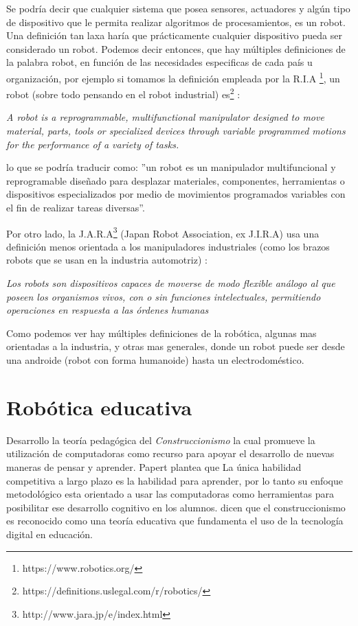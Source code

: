 Se podría decir que cualquier sistema que posea sensores, actuadores y algún tipo de dispositivo que le permita realizar algoritmos de procesamientos, es un robot. Una definición tan laxa haría que prácticamente cualquier dispositivo pueda ser considerado un robot. Podemos decir entonces, que hay múltiples definiciones de la palabra robot, en función de las necesidades especificas de cada país u organización, por ejemplo si tomamos la definición empleada por la R.I.A \footnote{https://www.robotics.org/}, un robot (sobre todo pensando en el robot industrial) es\footnote{https://definitions.uslegal.com/r/robotics/} : 
  

\begin{center}
\textit{A robot is a reprogrammable, multifunctional manipulator designed to move material, parts, tools or specialized devices through variable programmed motions for the performance of a variety of tasks.}
\end{center}

lo que se podría traducir como: ''un robot es un manipulador multifuncional y reprogramable diseñado para desplazar materiales, componentes, herramientas o dispositivos especializados por medio de movimientos programados variables con el fin de realizar tareas diversas''.

Por otro lado, la J.A.R.A\footnote{http://www.jara.jp/e/index.html} (Japan Robot Association, ex J.I.R.A) usa una definición menos orientada a los manipuladores industriales (como los brazos robots que se usan en la industria automotriz) \cite{reyes_cortes_robotica:_2011}:

\begin{center}
\textit{Los robots son dispositivos capaces de moverse de modo flexible análogo al que poseen los organismos vivos, con o sin funciones intelectuales, permitiendo operaciones en respuesta a las órdenes humanas}
\end{center}

Como podemos ver hay múltiples definiciones de la robótica, algunas mas orientadas a la industria, y otras mas generales, donde un robot puede ser desde una androide (robot con forma humanoide) hasta un electrodoméstico. 


\section{Robótica educativa}
\citet{seymour_papert_desafio_1987} Desarrollo la teoría pedagógica del \textit{Construccionismo} la cual promueve la utilización de computadoras como recurso para apoyar el desarrollo de nuevas maneras de pensar y aprender. Papert plantea que La única habilidad competitiva a largo plazo es la habilidad para aprender, por lo tanto su enfoque metodológico esta orientado a usar las computadoras como herramientas para posibilitar ese desarrollo cognitivo en los alumnos. \citet{sanchez_robotica_2012} dicen que el construccionismo es reconocido como una teoría educativa que fundamenta el uso de la tecnología digital en educación.

